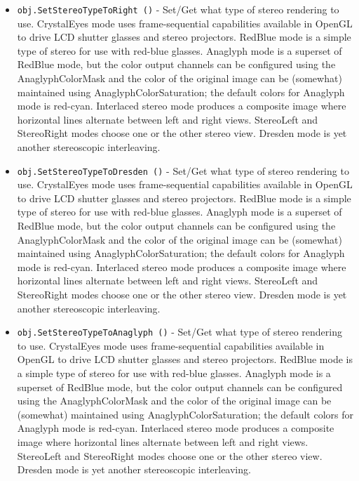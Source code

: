 \begin{itemize}
\item  \verb|obj.SetStereoTypeToRight ()| -  Set/Get what type of stereo rendering to use.  CrystalEyes
 mode uses frame-sequential capabilities available in OpenGL
 to drive LCD shutter glasses and stereo projectors.  RedBlue
 mode is a simple type of stereo for use with red-blue glasses.
 Anaglyph mode is a superset of RedBlue mode, but the color
 output channels can be configured using the AnaglyphColorMask
 and the color of the original image can be (somewhat) maintained
 using AnaglyphColorSaturation;  the default colors for Anaglyph
 mode is red-cyan.  Interlaced stereo mode produces a composite
 image where horizontal lines alternate between left and right
 views.  StereoLeft and StereoRight modes choose one or the other
 stereo view.  Dresden mode is yet another stereoscopic
 interleaving.

\item  \verb|obj.SetStereoTypeToDresden ()| -  Set/Get what type of stereo rendering to use.  CrystalEyes
 mode uses frame-sequential capabilities available in OpenGL
 to drive LCD shutter glasses and stereo projectors.  RedBlue
 mode is a simple type of stereo for use with red-blue glasses.
 Anaglyph mode is a superset of RedBlue mode, but the color
 output channels can be configured using the AnaglyphColorMask
 and the color of the original image can be (somewhat) maintained
 using AnaglyphColorSaturation;  the default colors for Anaglyph
 mode is red-cyan.  Interlaced stereo mode produces a composite
 image where horizontal lines alternate between left and right
 views.  StereoLeft and StereoRight modes choose one or the other
 stereo view.  Dresden mode is yet another stereoscopic
 interleaving.

\item  \verb|obj.SetStereoTypeToAnaglyph ()| -  Set/Get what type of stereo rendering to use.  CrystalEyes
 mode uses frame-sequential capabilities available in OpenGL
 to drive LCD shutter glasses and stereo projectors.  RedBlue
 mode is a simple type of stereo for use with red-blue glasses.
 Anaglyph mode is a superset of RedBlue mode, but the color
 output channels can be configured using the AnaglyphColorMask
 and the color of the original image can be (somewhat) maintained
 using AnaglyphColorSaturation;  the default colors for Anaglyph
 mode is red-cyan.  Interlaced stereo mode produces a composite
 image where horizontal lines alternate between left and right
 views.  StereoLeft and StereoRight modes choose one or the other
 stereo view.  Dresden mode is yet another stereoscopic
 interleaving.


\end{itemize}

